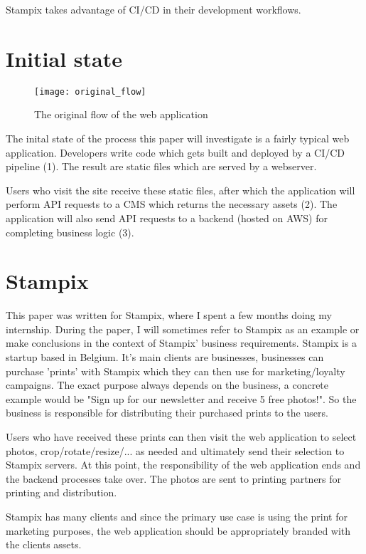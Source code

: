 Stampix takes advantage of CI/CD in their development workflows.

\section{Initial state}

\begin{figure}[h!]
	\texttt{[image: original\_flow]}
	\caption{The original flow of the web application}
	\label{fig:original_flow}
\end{figure}


The inital state of the process this paper will investigate is a fairly typical web application. 
Developers write code which gets built and deployed by a CI/CD pipeline (1). The result are static files which are served by a webserver.

Users who visit the site receive these static files, after which the application will perform API requests to a CMS which returns the necessary assets (2). 
The application will also send API requests to a backend (hosted on AWS) for completing business logic (3).


\section{Stampix}

This paper was written for Stampix, where I spent a few months doing my internship. During the paper, I will sometimes refer to Stampix as an example or make conclusions in the context of Stampix' business requirements.
Stampix is a startup based in Belgium. It's main clients are businesses, businesses can purchase 'prints' with Stampix which they can then use for marketing/loyalty campaigns. 
The exact purpose always depends on the business, a concrete example would be "Sign up for our newsletter and receive 5 free photos!". So the business is responsible for distributing their purchased prints to the users.

Users who have received these prints can then visit the web application to select photos, crop/rotate/resize/... as needed and ultimately send their selection to Stampix servers. 
At this point, the responsibility of the web application ends and the backend processes take over. The photos are sent to printing partners for printing and distribution.

Stampix has many clients and since the primary use case is using the print for marketing purposes, the web application should be appropriately branded with the clients assets.
